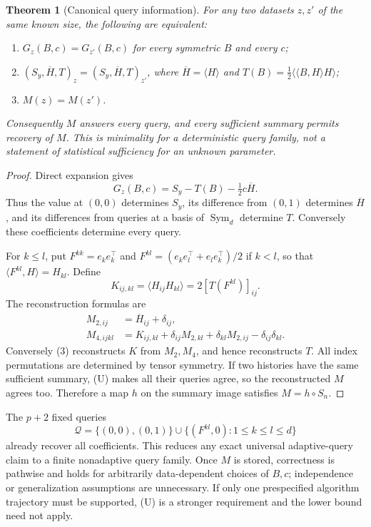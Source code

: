\documentclass[11pt]{article}
\newtheorem{theorem}{Theorem}
\newcommand{\Sym}{\operatorname{Sym}}
\begin{document}
\begin{theorem}[Canonical query information]
For any two datasets $z,z'$ of the same known size, the following are
equivalent:
\begin{enumerate}
 \item $G_z(B,c)=G_{z'}(B,c)$ for every symmetric $B$ and every $c$;
 \item $(S_y,\overline H,T)_z=(S_y,\overline H,T)_{z'}$, where
 $\overline H=\langle H\rangle$ and
 $T(B)=\tfrac12\langle\langle B,H\rangle H\rangle$;
 \item $M(z)=M(z')$.
\end{enumerate}
Consequently $M$ answers every query, and every sufficient summary
permits recovery of $M$. This is minimality for a deterministic
query family, not a statement of statistical sufficiency for an unknown
parameter.
\end{theorem}
\begin{proof}
Direct expansion gives
\[
 G_z(B,c)=S_y-T(B)-\tfrac12c\overline H. \tag{1}
\]
Thus the value at $(0,0)$ determines $S_y$, its difference from $(0,1)$
determines $\overline H$, and its differences from queries at a basis of
$\Sym_d$ determine $T$. Conversely these coefficients determine every
query.

For $k\le l$, put $F^{kk}=e_ke_k^\top$ and
$F^{kl}=(e_ke_l^\top+e_le_k^\top)/2$ if $k<l$, so that
$\langle F^{kl},H\rangle=H_{kl}$. Define
\[
 K_{ij,kl}=\langle H_{ij}H_{kl}\rangle
             =2[T(F^{kl})]_{ij}.
\]
The reconstruction formulas are
\begin{align}
 M_{2,ij}&=\overline H_{ij}+\delta_{ij},\tag{2}\\
 M_{4,ijkl}&=K_{ij,kl}
       +\delta_{ij}M_{2,kl}+\delta_{kl}M_{2,ij}
       -\delta_{ij}\delta_{kl}.\tag{3}
\end{align}
Conversely (3) reconstructs $K$ from $M_2,M_4$, and hence reconstructs
$T$. All index permutations are determined by tensor symmetry.
If two histories have the same sufficient summary, (U) makes all their
queries agree, so the reconstructed $M$ agrees too. Therefore a map
$h$ on the summary image satisfies $M=h\circ S_n$.
\end{proof}

The $p+2$ fixed queries
\[
 \mathcal Q=\{(0,0),(0,1)\}\cup
              \{(F^{kl},0):1\le k\le l\le d\}\tag{4}
\]
already recover all coefficients. This reduces any exact universal
adaptive-query claim to a finite nonadaptive query family. Once $M$ is
stored, correctness is pathwise and holds for arbitrarily data-dependent
choices of $B,c$; independence or generalization assumptions are unnecessary.
If only one prespecified algorithm trajectory must be supported, (U)
is a stronger requirement and the lower bound need not apply.
\end{document}

